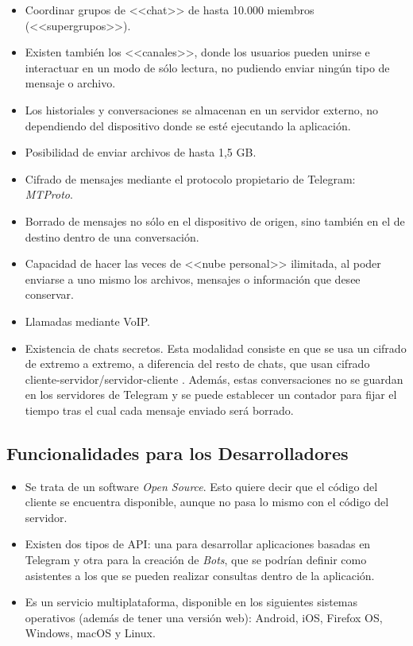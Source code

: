\begin{itemize}
	\item Coordinar grupos de <<chat>> de hasta 10.000 miembros (<<supergrupos>>).
	\item Existen también los <<canales>>, donde los usuarios pueden unirse e interactuar en un modo de sólo lectura, no pudiendo enviar ningún tipo de mensaje o archivo.
	\item Los historiales y conversaciones se almacenan en un servidor externo, no dependiendo del dispositivo donde se esté ejecutando la aplicación.
	\item Posibilidad de enviar archivos de hasta 1,5 \acf{GB}.
	\item Cifrado de mensajes mediante el protocolo propietario de Telegram: \textit{MTProto}.
	\item Borrado de mensajes no sólo en el dispositivo de origen, sino también en el de destino dentro de una conversación.
	\item Capacidad de hacer las veces de <<nube personal>> ilimitada, al poder enviarse a uno mismo los archivos, mensajes o información que desee conservar.
	\item Llamadas mediante \acs{VoIP}.
	\item Existencia de chats secretos. Esta modalidad consiste en que se usa un cifrado de extremo a extremo, a diferencia del resto de chats, que usan cifrado cliente-servidor/servidor-cliente \cite{Telegram2017a}. Además, estas conversaciones no se guardan en los servidores de Telegram y se puede establecer un contador para fijar el tiempo tras el cual cada mensaje enviado será borrado.
\end{itemize}

\subsection{Funcionalidades para los Desarrolladores}

\begin{itemize}
	\item Se trata de un software \textit{Open Source}. Esto quiere decir que el código del cliente se encuentra disponible, aunque no pasa lo mismo con el código del servidor.
	\item Existen dos tipos de \acs{API}: una para desarrollar aplicaciones basadas en Telegram y otra para la creación de \textit{Bots}, que se podrían definir como asistentes a los que se pueden realizar consultas dentro de la aplicación.
	\item Es un servicio multiplataforma, disponible en los siguientes sistemas operativos (además de tener una versión web): Android, iOS, Firefox OS, Windows, macOS y Linux.
\end{itemize}

